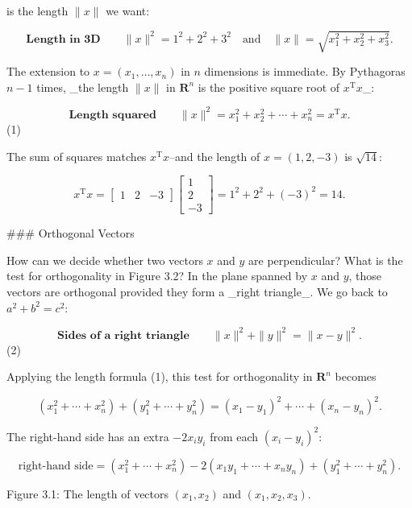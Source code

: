 is the length \(\|x\|\) we want:

\[\textbf{Length in 3D}\qquad\|x\|^{2}=1^{2}+2^{2}+3^{2}\quad\text{and}\quad\|x\|= \sqrt{x_{1}^{2}+x_{2}^{2}+x_{3}^{2}}.\]

The extension to \(x=(x_{1},\ldots,x_{n})\) in \(n\) dimensions is immediate. By Pythagoras \(n-1\) times, _the length \(\|x\|\) in \(\mathbf{R}^{n}\) is the positive square root of \(x^{\mathrm{T}}x\)_:

\[\textbf{Length squared}\qquad\|x\|^{2}=x_{1}^{2}+x_{2}^{2}+\cdots+x_{n}^{2}=x^{ \mathrm{T}}x.\] (1)

The sum of squares matches \(x^{\mathrm{T}}x\)--and the length of \(x=(1,2,-3)\) is \(\sqrt{14}\):

\[x^{\mathrm{T}}x=\begin{bmatrix}1&2&-3\end{bmatrix}\begin{bmatrix}1\\ 2\\ -3\end{bmatrix}=1^{2}+2^{2}+(-3)^{2}=14.\]

### Orthogonal Vectors

How can we decide whether two vectors \(x\) and \(y\) are perpendicular? What is the test for orthogonality in Figure 3.2? In the plane spanned by \(x\) and \(y\), those vectors are orthogonal provided they form a _right triangle_. We go back to \(a^{2}+b^{2}=c^{2}\):

\[\textbf{Sides of a right triangle}\qquad\|x\|^{2}+\|y\|^{2}=\|x-y\|^{2}.\] (2)

Applying the length formula (1), this test for orthogonality in \(\mathbf{R}^{n}\) becomes

\[\left(x_{1}^{2}+\cdots+x_{n}^{2}\right)+\left(y_{1}^{2}+\cdots+y_{n}^{2} \right)=(x_{1}-y_{1})^{2}+\cdots+(x_{n}-y_{n})^{2}.\]

The right-hand side has an extra \(-2x_{i}y_{i}\) from each \((x_{i}-y_{i})^{2}\):

\[\text{right-hand side}=\left(x_{1}^{2}+\cdots+x_{n}^{2}\right)-2(x_{1}y_{1}+ \cdots+x_{n}y_{n})+\left(y_{1}^{2}+\cdots+y_{n}^{2}\right).\]

Figure 3.1: The length of vectors \((x_{1},x_{2})\) and \((x_{1},x_{2},x_{3})\).

 